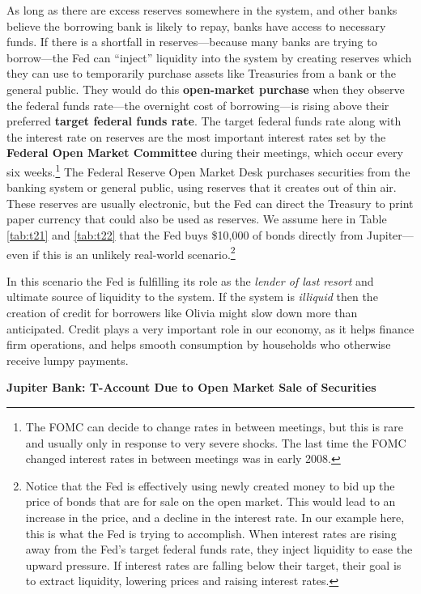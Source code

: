 \documentclass[
]{book}
\begin{document}
As long as there are excess reserves somewhere in the system, and other banks believe the borrowing bank is likely to repay, banks have access to necessary funds. If there is a shortfall in reserves---because many banks are trying to borrow---the Fed can ``inject'' liquidity into the system by creating reserves which they can use to temporarily purchase assets like Treasuries from a bank or the general public. They would do this \textbf{open-market purchase} when they observe the federal funds rate---the overnight cost of borrowing---is rising above their preferred \textbf{target federal funds rate}. The target federal funds rate along with the interest rate on reserves are the most important interest rates set by the \textbf{Federal Open Market Committee} during their meetings, which occur every six weeks.\footnote{The FOMC can decide to change rates in between meetings, but this is rare and usually only in response to very severe shocks. The last time the FOMC changed interest rates in between meetings was in early 2008.} The Federal Reserve Open Market Desk purchases securities from the banking system or general public, using reserves that it creates out of thin air. These reserves are usually electronic, but the Fed can direct the Treasury to print paper currency that could also be used as reserves. We assume here in Table \ref{tab:t21} and \ref{tab:t22} that the Fed buys \$10,000 of bonds directly from Jupiter---even if this is an unlikely real-world scenario.\footnote{Notice that the Fed is effectively using newly created money to bid up the price of bonds that are for sale on the open market. This would lead to an increase in the price, and a decline in the interest rate. In our example here, this is what the Fed is trying to accomplish. When interest rates are rising away from the Fed's target federal funds rate, they inject liquidity to ease the upward pressure. If interest rates are falling below their target, their goal is to extract liquidity, lowering prices and raising interest rates.}

In this scenario the Fed is fulfilling its role as the \emph{lender of last resort} and ultimate source of liquidity to the system. If the system is \emph{illiquid} then the creation of credit for borrowers like Olivia might slow down more than anticipated. Credit plays a very important role in our economy, as it helps finance firm operations, and helps smooth consumption by households who otherwise receive lumpy payments.

\label{tab:t21}\textbf{Jupiter Bank: T-Account Due to Open Market Sale of Securities}
\end{document}
